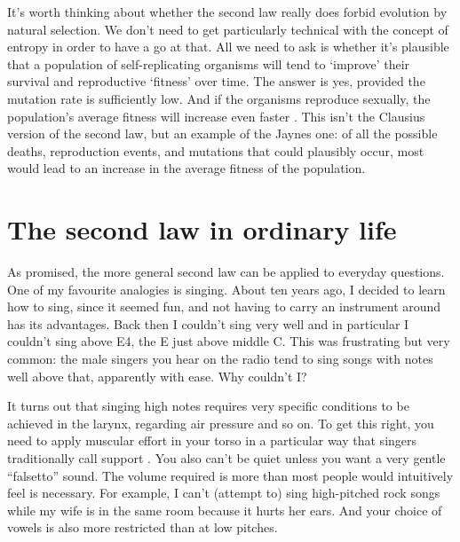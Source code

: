 \documentclass[a4paper, 12pt]{article}
\begin{document}
It's worth thinking about whether the second law really does forbid evolution
by natural selection. We don't need to get particularly technical with the
concept of entropy in order to have a go at that. All we need to ask is whether
it's plausible that a population of self-replicating organisms will tend to
`improve' their survival and reproductive `fitness' over time.
The answer is yes, provided the mutation rate is sufficiently
low. And if the organisms reproduce sexually, the population's average fitness
will increase even faster \citep{mackay}. This isn't the Clausius version of
the second law, but an example of the Jaynes one: of all the possible deaths,
reproduction events, and mutations that could plausibly occur, most would lead to
an increase in the average fitness of the population.

\section*{The second law in ordinary life}
As promised, the more general second law can be applied to everyday questions.
One of my favourite analogies is singing. About ten years ago, I decided to
learn how to sing, since it seemed fun, and not having to carry an instrument
around has its advantages. Back then I couldn't sing very well and in particular
I couldn't sing above E4, the E just above middle C. This was frustrating but
very common: the male singers you hear on the radio tend to sing songs with
notes well above that, apparently with ease. Why couldn't I?

It turns out that singing high notes requires very specific conditions to be
achieved in the larynx, regarding air pressure and so on. To get this right,
you need to apply muscular effort in your torso in a particular way that singers
traditionally call support \citep{cvt}. You also can't be quiet unless you want
a very gentle ``falsetto'' sound. The volume required is more than most people
would intuitively feel is necessary. For example, I can't (attempt to)
sing high-pitched
rock songs while my wife is in the same room because it hurts her ears. And
your choice of vowels is also more restricted than at low pitches.
\end{document}
